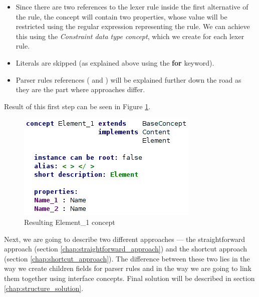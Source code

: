\begin{itemize}
	\item Since there are two references to the  lexer rule inside the first alternative of the  rule, the  concept will contain two properties, whose value will be restricted using the regular expression representing the  rule.
	We can achieve this using the \textit{Constraint data type concept}, which we create for each lexer rule.

	\item Literals are skipped (as explained above using the \textbf{for} keyword).

	\item Parser rules references ( and ) will be explained further down the road as they are the part where approaches differ.
\end{itemize}

Result of this first step can be seen in Figure \ref{fig:element_concept_common}.

\begin{figure}[h]
	\centering
	\includegraphics[scale=0.7]{./img/element_concept_common.png}
	\caption{Resulting Element{\_}1 concept}
	\label{fig:element_concept_common}
\end{figure}

Next, we are going to describe two different approaches --- the straightforward approach (section \ref{chap:straightforward_approach}) and the shortcut approach (section \ref{chap:shortcut_approach}).
The difference between these two lies in the way we create children fields for parser rules and in the way we are going to link them together using interface concepts.
Final solution will be described in section \ref{chap:structure_solution}.

\pagebreak



\pagebreak

